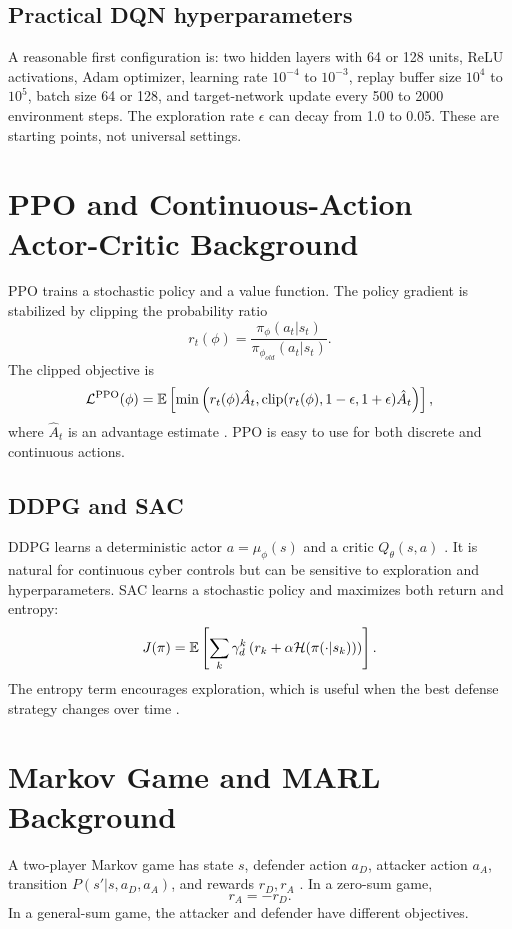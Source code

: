 \documentclass[11pt,a4paper]{article}
\begin{document}
\subsection{Practical DQN hyperparameters}
A reasonable first configuration is: two hidden layers with 64 or 128 units, ReLU activations, Adam optimizer, learning rate $10^{-4}$ to $10^{-3}$, replay buffer size $10^4$ to $10^5$, batch size 64 or 128, and target-network update every 500 to 2000 environment steps. The exploration rate $\epsilon$ can decay from 1.0 to 0.05. These are starting points, not universal settings.

\section{PPO and Continuous-Action Actor-Critic Background}
PPO trains a stochastic policy and a value function. The policy gradient is stabilized by clipping the probability ratio
\begin{equation}
    r_t(\phi)=\frac{\pi_\phi(a_t|s_t)}{\pi_{\phi_{old}}(a_t|s_t)}.
\end{equation}
The clipped objective is
\begin{equation}
\mathcal{L}^{\text{PPO}}(\phi)=
\mathbb{E}\left[\min\left(r_t(\phi)\hat{A}_t,\operatorname{clip}(r_t(\phi),1-\epsilon,1+\epsilon)\hat{A}_t\right)\right],
\end{equation}
where $\hat{A}_t$ is an advantage estimate 
\cite{schulman2017}. PPO is easy to use for both discrete and continuous actions.

\subsection{DDPG and SAC}
DDPG learns a deterministic actor $a=\mu_\phi(s)$ and a critic $Q_\theta(s,a)$ 
\cite{lillicrap2015}. It is natural for continuous cyber controls but can be sensitive to exploration and hyperparameters. SAC learns a stochastic policy and maximizes both return and entropy:
\begin{equation}
    J(\pi)=\mathbb{E}\left[\sum_k \gamma_d^k\left(r_k+\alpha\mathcal{H}(\pi(\cdot|s_k))\right)\right].
\end{equation}
The entropy term encourages exploration, which is useful when the best defense strategy changes over time 
\cite{haarnoja2018}.

\section{Markov Game and MARL Background}\label{app:marl-background}
A two-player Markov game has state $s$, defender action $a_D$, attacker action $a_A$, transition $P(s'|s,a_D,a_A)$, and rewards $r_D,r_A$ 
\cite{littman1994}. In a zero-sum game,
\begin{equation}
    r_A=-r_D.
\end{equation}
In a general-sum game, the attacker and defender have different objectives.
\end{document}
